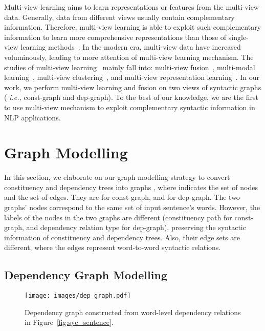 \documentclass[11pt]{article}
\newcommand{\ie}{\emph{i.e.,}\xspace}
\begin{document}
Multi-view learning aims to learn representations or features from the multi-view data. Generally, data from different views usually contain complementary information. Therefore, multi-view learning is able to exploit such complementary information to learn more comprehensive representations than those of single-view learning methods~\cite{8471216}.
In the modern era, multi-view data have increased voluminously, leading to more attention of multi-view learning mechanism. The studies of multi-view learning~\cite{YAN2021106} mainly fall into: multi-view fusion~\cite{ZHAO201743,sun2013survey}, multi-modal learning~\cite{8103116,8269806}, multi-view clustering~\cite{9395530}, and multi-view representation learning~\cite{8471216,8715409, mane_multi_view_2021}.
In our work, we perform multi-view learning and fusion on two views of syntactic graphs ( \ie const-graph and dep-graph).
To the best of our knowledge, we are the first to use multi-view mechanism to exploit complementary syntactic information in NLP applications.

\section{Graph Modelling}
In this section, we elaborate on our graph modelling strategy to convert constituency and dependency trees into graphs , where  indicates the set of nodes and  the set of edges.
They are  for const-graph, and  for dep-graph. The two graphs' nodes correspond to the same set of input sentence's words. 
However, the labels of the nodes in the two graphs are different (constituency path for const-graph, and dependency relation type for dep-graph), preserving the syntactic information of constituency and dependency trees. Also, their edge sets are different, where the edges represent word-to-word syntactic relations.



\subsection{Dependency Graph Modelling}


\begin{figure}
    \centering
    \texttt{[image: images/dep\_graph.pdf]}
    \vspace{-0.5em}
    \caption{Dependency graph constructed from word-level dependency relations in Figure~\ref{fig:syc_sentence}.}
    \label{fig:dep_graph}
    \vspace{-1.5em}
\end{figure}
\end{document}
